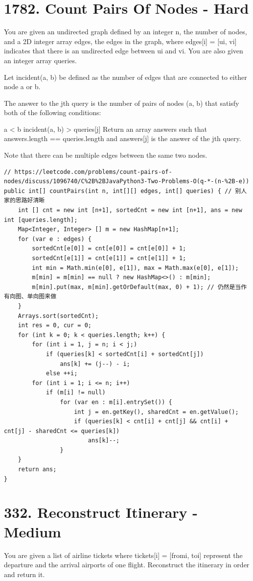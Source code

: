 \documentclass[9pt, b5paaper]{book}
\begin{document}
\section{1782. Count Pairs Of Nodes - Hard}
\label{sec-7-5}
You are given an undirected graph defined by an integer n, the number of nodes, and a 2D integer array edges, the edges in the graph, where edges[i] = [ui, vi] indicates that there is an undirected edge between ui and vi. You are also given an integer array queries.

Let incident(a, b) be defined as the number of edges that are connected to either node a or b.

The answer to the jth query is the number of pairs of nodes (a, b) that satisfy both of the following conditions:

a < b
incident(a, b) > queries[j]
Return an array answers such that answers.length == queries.length and answers[j] is the answer of the jth query.

Note that there can be multiple edges between the same two nodes.
\begin{verbatim}
// https://leetcode.com/problems/count-pairs-of-nodes/discuss/1096740/C%2B%2BJavaPython3-Two-Problems-O(q-*-(n-%2B-e))
public int[] countPairs(int n, int[][] edges, int[] queries) { // 别人家的思路好清晰
    int [] cnt = new int [n+1], sortedCnt = new int [n+1], ans = new int [queries.length];
    Map<Integer, Integer> [] m = new HashMap[n+1];
    for (var e : edges) {
        sortedCnt[e[0]] = cnt[e[0]] = cnt[e[0]] + 1;
        sortedCnt[e[1]] = cnt[e[1]] = cnt[e[1]] + 1;
        int min = Math.min(e[0], e[1]), max = Math.max(e[0], e[1]);
        m[min] = m[min] == null ? new HashMap<>() : m[min];
        m[min].put(max, m[min].getOrDefault(max, 0) + 1); // 仍然是当作有向图、单向图来做
    }
    Arrays.sort(sortedCnt);
    int res = 0, cur = 0;
    for (int k = 0; k < queries.length; k++) {
        for (int i = 1, j = n; i < j;) 
            if (queries[k] < sortedCnt[i] + sortedCnt[j])
                ans[k] += (j--) - i;
            else ++i;
        for (int i = 1; i <= n; i++) 
            if (m[i] != null) 
                for (var en : m[i].entrySet()) {
                    int j = en.getKey(), sharedCnt = en.getValue();
                    if (queries[k] < cnt[i] + cnt[j] && cnt[i] + cnt[j] - sharedCnt <= queries[k])
                        ans[k]--;
                }
    } 
    return ans;
}
\end{verbatim}

\section{332. Reconstruct Itinerary - Medium}
\label{sec-7-6}
You are given a list of airline tickets where tickets[i] = [fromi, toi] represent the departure and the arrival airports of one flight. Reconstruct the itinerary in order and return it.
\end{document}
